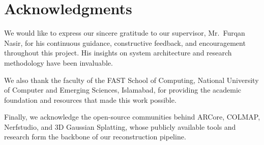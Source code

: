 \chapter*{Acknowledgments}

We would like to express our sincere gratitude to our supervisor, Mr.~Furqan Nasir, for his continuous guidance, constructive feedback, and encouragement throughout this project. His insights on system architecture and research methodology have been invaluable.

We also thank the faculty of the FAST School of Computing, National University of Computer and Emerging Sciences, Islamabad, for providing the academic foundation and resources that made this work possible.

Finally, we acknowledge the open-source communities behind ARCore, COLMAP, Nerfstudio, and 3D Gaussian Splatting, whose publicly available tools and research form the backbone of our reconstruction pipeline.
